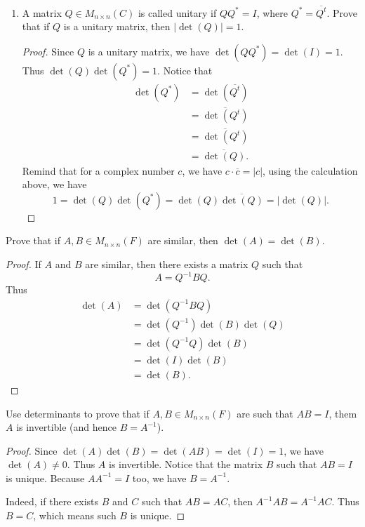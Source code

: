 \documentclass[12pt, a4paper]{article}
\theoremstyle{plain}
\begin{document}
\begin{exercise}{13}
\begin{enumerate}[label=(\alph*)]
\begin{proof}
\begin{align*}
		&=\sum_{i=1}^{n}{\overline{A_{1i}\det(\tilde{A}_{1i}})}\\
		&=\sum_{i=1}^{n}{\overline{A_{1i}}\cdot \overline{\det(\tilde{A}_{1i}})}\\
		&=\sum_{i=1}^{n}{\overline{A_{1,i}}\cdot\det\left(\overline{\tilde{A}}\right)}\\
		&=\det(\overline{A}).
		\end{align*}
		\end{proof}
	\item A matrix $Q\in M_{n\times n}(C)$ is called unitary if $QQ^*=I$, where $Q^*=\overline{Q^t}$. Prove that if $Q$ is a unitary matrix, then $|\det(Q)|=1$.
		\begin{proof}
		Since $Q$ is a unitary matrix, we have $\det(QQ^*)=\det(I)=1$. Thus $\det(Q)\det(Q^*)=1$. Notice that 
		\begin{align*}
		\det(Q^*)&=\det(\overline{Q^t})\\
		&=\overline{\det(Q^t)}\\
		&=\overline{\det(Q^t)}\\
		&=\overline{\det(Q)}.
		\end{align*}
		Remind that for a complex number $c$, we have $c\cdot \overline{c}=|c|$, using the calculation above, we have 
		\[
		1=\det(Q)\det(Q^*)=\det(Q)\overline{\det(Q)}=|\det(Q)|.
		\]
		\end{proof}
	\end{enumerate}
\end{exercise}

\begin{exercise}{15}
Prove that if $A,B\in M_{n\times n}(F)$ are similar, then $\det(A)=\det(B)$.
\end{exercise}
	\begin{proof}
	If $A$ and $B$ are similar, then there exists a matrix $Q$ such that 
	\[
	A=Q^{-1}BQ.
	\]
	Thus
	\begin{align*}
	\det(A)&=\det(Q^{-1}BQ)\\
	&= \det(Q^{-1})\det(B)\det(Q)\\
	&=\det(Q^{-1}Q)\det(B)\\
	&=\det(I)\det(B)\\
	&=\det(B).
	\end{align*}
	\end{proof}

\begin{exercise}{16}
Use determinants to prove that if $A,B\in M_{n\times n}(F)$ are such that $AB=I$, them $A$ is invertible (and hence $B=A^{-1}$).
\end{exercise}
	\begin{proof}
	Since $\det(A)\det(B)=\det(AB)=\det(I)=1$, we have $\det(A)\neq 0$. Thus $A$ is invertible. Notice that the matrix $B$ such that $AB=I$ is unique. Because $AA^{-1}=I$ too, we have $B=A^{-1}$.
	
	Indeed, if there exists $B$ and $C$ such that $AB=AC$, then $A^{-1}AB=A^{-1}AC$. Thus $B=C$, which means such $B$ is unique. 
	\end{proof}
	
\end{document}
